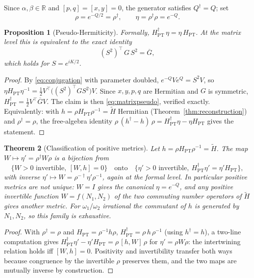 \documentclass[11pt]{article}
\newtheorem{theorem}{Theorem}[section]
\newtheorem{proposition}[theorem]{Proposition}
\theoremstyle{definition}
\theoremstyle{remark}
\newcommand{\R}{\mathbb{R}}
\newcommand{\w}{\omega}
\newcommand{\dg}{\dagger}
\begin{document}
Since $\alpha,\beta\in\R$ and $[p,q]=[x,y]=0$, the generator satisfies
$Q^{\dg}=Q$; set
\begin{equation}
\rho=e^{-Q/2}=\rho^{\dg},
\qquad
\eta=\rho^{\dg}\rho=e^{-Q} .
\end{equation}

\begin{proposition}[Pseudo-Hermiticity]\label{prop:pseudo}
Formally, $H_{\mathrm{PT}}^{\dg}\,\eta=\eta\,H_{\mathrm{PT}}$.  At the matrix
level this is equivalent to the exact identity
\begin{equation}\label{eq:matrixpseudo}
(S^2)^{\top}\,G\,S^2=\overline G ,
\end{equation}
which holds for $S=e^{iK/2}$.
\end{proposition}

\begin{proof}
By \eqref{eq:conjugation} with parameter doubled,
$e^{-Q}Ve^{Q}=S^2V$, so
$\eta H_{\mathrm{PT}}\eta^{-1}=\tfrac12V^{\top}\!\big((S^2)^{\top}GS^2\big)V$.
Since $x,y,p,q$ are Hermitian and $G$ is symmetric,
$H_{\mathrm{PT}}^{\dg}=\tfrac12V^{\top}\overline GV$.  The claim is then
\eqref{eq:matrixpseudo}, verified exactly.  Equivalently: with
$h=\rho H_{\mathrm{PT}}\rho^{-1}=\widetilde H$ Hermitian
(Theorem~\ref{thm:reconstruction}) and $\rho^{\dg}=\rho$, the free-algebra
identity $\rho\,(h^{\dg}-h)\,\rho
=H_{\mathrm{PT}}^{\dg}\eta-\eta H_{\mathrm{PT}}$ gives the statement.
\end{proof}

\begin{theorem}[Classification of positive metrics]\label{thm:metrics}
Let $h=\rho H_{\mathrm{PT}}\rho^{-1}=\widetilde H$.  The map
$W\mapsto\eta'=\rho^{\dg}W\rho$ is a bijection from
\begin{equation}
\{W>0 \text{ invertible},\ [W,h]=0\}
\quad\text{onto}\quad
\{\eta'>0 \text{ invertible},\
H_{\mathrm{PT}}^{\dg}\eta'=\eta'H_{\mathrm{PT}}\},
\end{equation}
with inverse $\eta'\mapsto W=\rho^{-\dg}\eta'\rho^{-1}$, again at the formal
level.  In particular positive metrics are \emph{not} unique: $W=I$ gives the
canonical $\eta=e^{-Q}$, and any positive invertible function
$W=f(N_1,N_2)$ of the two commuting number operators of $\widetilde H$ gives
another metric.  For $\w_1/\w_2$ irrational the commutant of $h$ is generated
by $N_1,N_2$, so this family is exhaustive.
\end{theorem}

\begin{proof}
With $\rho^{\dg}=\rho$ and $H_{\mathrm{PT}}=\rho^{-1}h\rho$,
$H_{\mathrm{PT}}^{\dg}=\rho\,h\,\rho^{-1}$ (using $h^{\dg}=h$), a two-line
computation gives
$H_{\mathrm{PT}}^{\dg}\eta'-\eta'H_{\mathrm{PT}}=\rho\,[h,W]\,\rho$
for $\eta'=\rho W\rho$: the intertwining relation holds iff $[W,h]=0$.
Positivity and invertibility transfer both ways because congruence by the
invertible $\rho$ preserves them, and the two maps are mutually inverse by
construction.
\end{proof}
\end{document}
